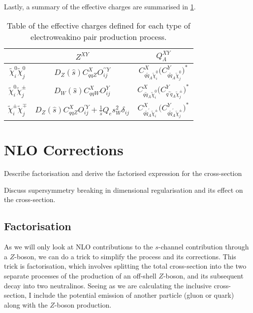 \documentclass[../main.tex]{subfiles}
\begin{document}
Lastly, a summary of the effective charges are summarised in \cref{part:tab:eff_charges}.

{\renewcommand{\arraystretch}{2}
\begin{table}
  \centering
  \begin{tabular}{|c|cc|}
    \hline
                                          & \(Z^{XY}\)                                                                             & \(Q_A^{XY}\)                                                                                                   \\
    \hline
    \(\tilde\chi^0_i \tilde\chi^0_j\)     & \(D_Z(\hat{s}) C_{qqZ}^X O_{ij}^{\prime\prime Y}\)                                     & \(C_{q\tilde{q}_A \tilde\chi^0_i}^X \bigl(C_{q\tilde{q}_A \tilde\chi^0_j}^Y\bigr)^{\!\ast}\)                   \\
    \(\tilde\chi^0_i \tilde\chi^\pm_j\)   & \(D_W(\hat{s}) C_{qqW}^X O_{ij}^{Y}\)                                                  & \(C_{q\tilde{q}_A \tilde\chi^0_i}^X \bigl(C_{q^\prime \tilde{q}_A \tilde\chi^\pm_j}^Y\bigr)^{\!\ast}\)         \\
    \(\tilde\chi^\pm_i \tilde\chi^\mp_j\) & \(D_Z(\hat{s}) C_{qqZ}^X O_{ij}^{\prime Y} + \frac{1}{\hat{s}} Q_e s_W^2 \delta_{ij}\) & \(C_{q\tilde{q}^\prime_A \tilde\chi^\pm_i}^X \bigl(C_{q\tilde{q}^\prime_A \tilde\chi^\pm_j}^Y\bigr)^{\!\ast}\) \\
    \hline
  \end{tabular}
  \caption{Table of the effective charges defined for each type of electroweakino pair production process.}
  \label{part:tab:eff_charges}
\end{table}


}


\section{NLO Corrections}
\begin{TODO}
  \item Describe factorisation and derive the factorised expression for
  the cross-section
  \item Discuss supersymmetry breaking in dimensional regularisation and
  its effect on
  the cross-section.
\end{TODO}

\subsection{Factorisation}
As we will only look at NLO contributions to the \(s\)-channel contribution through a \(Z\)-boson, we can do a trick to simplify the process and its corrections.
This trick is factorisation, which involves splitting the total cross-section into the two separate processes of the production of an off-shell \(Z\)-boson, and its subsequent decay into two neutralinos.
Seeing as we are calculating the inclusive cross-section, I include the potential emission of another particle (gluon or quark) along with the \(Z\)-boson production.
\end{document}
